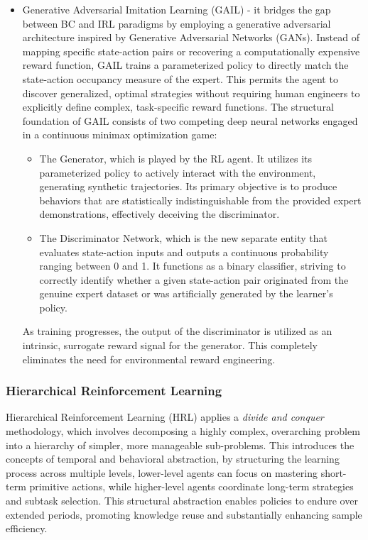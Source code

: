 \begin{itemize}
	\item Generative Adversarial Imitation Learning (GAIL) - it bridges the gap between BC and IRL paradigms by employing a generative adversarial architecture inspired by Generative Adversarial Networks (GANs).  Instead of mapping specific state-action pairs or recovering a computationally expensive reward function, GAIL trains a parameterized policy to directly match the state-action occupancy measure of the expert. This permits the agent to discover generalized, optimal strategies without requiring human engineers to explicitly define complex, task-specific reward functions. The structural foundation of GAIL consists of two competing deep neural networks engaged in a continuous minimax optimization game:
	\begin{itemize}
		\item The Generator, which is played by the RL agent. It utilizes its parameterized policy to actively interact with the environment, generating synthetic trajectories. Its primary objective is to produce behaviors that are statistically indistinguishable from the provided expert demonstrations, effectively deceiving the discriminator.
		\item The Discriminator Network, which is the new separate entity that evaluates state-action inputs and outputs a continuous probability ranging between 0 and 1. It functions as a binary classifier, striving to correctly identify whether a given state-action pair originated from the genuine expert dataset or was artificially generated by the learner's policy. 
	\end{itemize}
	As training progresses, the output of the discriminator is utilized as an intrinsic, surrogate reward signal for the generator. This completely eliminates the need for environmental reward engineering. \cite{ding2020imitation}
\end{itemize}

\subsubsection{Hierarchical Reinforcement Learning}
Hierarchical Reinforcement Learning (HRL) applies a \textit{divide and conquer} methodology, which involves decomposing a highly complex, overarching problem into a hierarchy of simpler, more manageable sub-problems. This introduces the concepts of temporal and behavioral abstraction, by structuring the learning process across multiple levels, lower-level agents can focus on mastering short-term primitive actions, while higher-level agents coordinate long-term strategies and subtask selection. This structural abstraction enables policies to endure over extended periods, promoting knowledge reuse and substantially enhancing sample efficiency. \cite{Multi_agent_Sparse_Reward}
